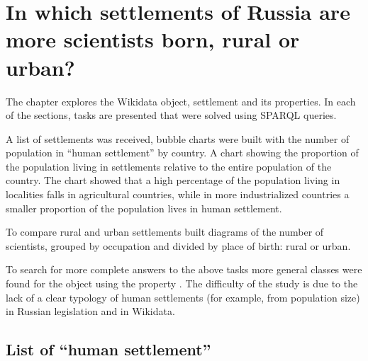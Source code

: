 \setchapterpreamble[u]{\margintoc}
\chapter[In which settlements of Russia are more scientists born, rural or urban?]{In which settlements of Russia are more scientists born, rural or urban?\protect\footnotemark}


The chapter explores the Wikidata object,  settlement and its properties. In each of the sections, 
tasks are presented that were solved using SPARQL queries.

A list of settlements was received,
bubble charts were built with the number of population in ``human settlement'' by country.
A chart showing the proportion of the population
living in settlements relative to the entire population of the country.
The chart showed that a high percentage of the population living in localities
falls in agricultural countries, while in more industrialized countries
a smaller proportion of the population lives in human settlement.

To compare rural and urban settlements
built diagrams of the number of scientists, grouped by occupation
and divided by place of birth: rural or urban.

To search for more complete answers to the above tasks
more general classes were found for the object 
using the property .
The difficulty of the study is due to the lack of a clear typology of human settlements
(for example, from population size) in Russian legislation and in Wikidata.

%

\section{List of ``human settlement''}

